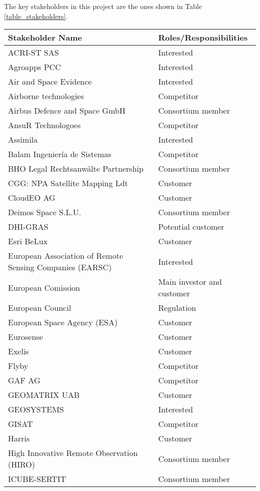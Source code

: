 The key stakeholders in this project are the ones shown in Table \ref{table_stakeholders}.
\begin{center}

\begin{longtable}{ll}
\toprule[2pt]
\textbf{Stakeholder Name  }                  & \textbf{Roles/Responsibilities                                                                                                                  } \\ \midrule[1.5pt]
ACRI-ST SAS&Interested\\
Agroapps PCC&Interested\\
Air and Space Evidence&Interested\\
Airborne technologies&Competitor\\
Airbus Defence and Space GmbH & Consortium member  \\ 
AnsuR Technologoes&Competitor\\
Assimila&Interested\\
Balam Ingeniería de Sistemas&Competitor\\
BHO Legal Rechtsanwälte Partnership & Consortium member\\ 
CGG: NPA Satellite Mapping Ldt&Customer\\
CloudEO AG&Customer\\
Deimos Space S.L.U.  & Consortium member \\
DHI-GRAS&Potential customer\\
Esri BeLux&Customer\\
European Association of Remote Sensing Companies (EARSC)&Interested\\
European Comission&Main investor and customer\\
European Council&Regulation\\
European Space Agency (ESA)&Customer\\ 
Eurosense&Customer\\
Exelis&Customer\\
Flyby&Competitor\\
GAF AG&Competitor\\
GEOMATRIX UAB&Customer\\
GEOSYSTEMS&Interested\\
GISAT&Competitor\\
Harris&Customer\\
High Innovative Remote Observation (HIRO) & Consortium member \\ 
ICUBE-SERTIT                        & Consortium member \\ 

\end{longtable}
\end{center}
